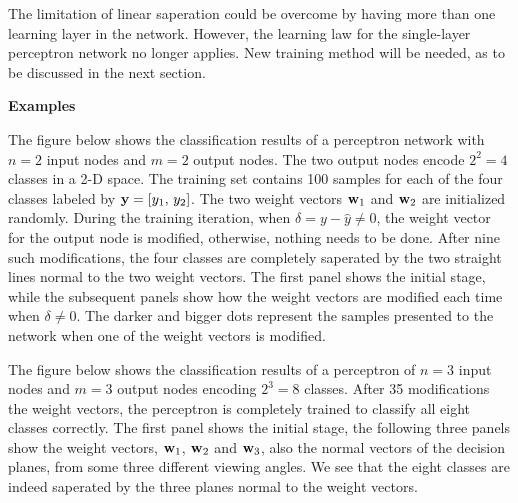 \documentclass{article}
\begin{document}
The limitation of linear saperation could be overcome by having more 
than one learning layer in the network. However, the learning law for 
the single-layer perceptron network no longer applies. New training
method will be needed, as to be discussed in the next section.

{\bf Examples}

The figure below shows the classification results of a perceptron 
network with $n=2$ input nodes and $m=2$ output nodes. The two output
nodes encode $2^2=4$ classes in a 2-D space. The training set contains
100 samples for each of the four classes labeled by ${\bf y}=[y_1,\,y_2]$.
The two weight vectors ${\bf w}_1$ and ${\bf w}_2$ are initialized 
randomly. During the training iteration, when $\delta=y-\hat{y}\ne 0$, the 
weight vector for the output node is modified, otherwise, nothing needs 
to be done. After nine such modifications, the four classes are completely 
saperated by the two straight lines normal to the two weight vectors.
The first panel shows the initial stage, while the subsequent panels 
show how the weight vectors are modified each time when $\delta\ne 0$.
The darker and bigger dots represent the samples presented to the 
network when one of the weight vectors is modified.


The figure below shows the classification results of a perceptron of
$n=3$ input nodes and $m=3$ output nodes encoding $2^3=8$ classes.
After 35 modifications the weight vectors, the perceptron is completely
trained to classify all eight classes correctly. The first panel shows
the initial stage, the following three panels show the weight vectors,
${\bf w}_1$, ${\bf w}_2$ and ${\bf w}_3$, also the normal vectors of
the decision planes, from some three different viewing angles. We see 
that the eight classes are indeed saperated by the three planes normal 
to the weight vectors.


\end{document}
